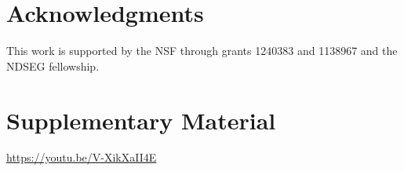 \documentclass[letterpaper, 10 pt, conference]{ieeeconf}
\begin{document}










\section*{Acknowledgments}
This work is supported by the NSF through grants 1240383 and 1138967 and the NDSEG fellowship.

\section*{Supplementary Material}
\url{https://youtu.be/V-XikXaII4E}



%


\end{document}
